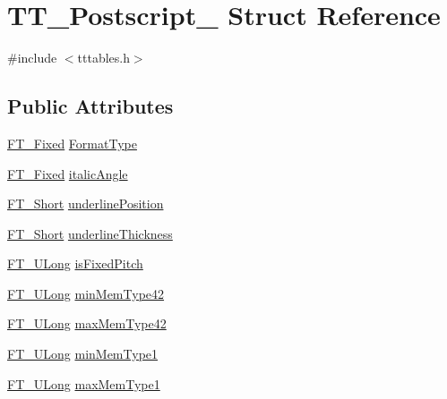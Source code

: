 \hypertarget{struct_t_t___postscript__}{\section{T\-T\-\_\-\-Postscript\-\_\- Struct Reference}
\label{struct_t_t___postscript__}
}


{\ttfamily \#include $<$tttables.\-h$>$}

\subsection*{Public Attributes}
\begin{DoxyCompactItemize}
\item 
\hyperlink{fttypes_8h_a5f5a679cc09f758efdd0d1c5feed3c3d}{F\-T\-\_\-\-Fixed} \hyperlink{struct_t_t___postscript___a5ed6585c01fa4ffc3f8537d58bdd955f}{Format\-Type}
\item 
\hyperlink{fttypes_8h_a5f5a679cc09f758efdd0d1c5feed3c3d}{F\-T\-\_\-\-Fixed} \hyperlink{struct_t_t___postscript___adcca36c7fbcbdff00fc8c2884a215830}{italic\-Angle}
\item 
\hyperlink{fttypes_8h_aa7279be89046a2563cd3d4d6651fbdcf}{F\-T\-\_\-\-Short} \hyperlink{struct_t_t___postscript___a909fd5064ab7547bb8ed984b5dfe2fe2}{underline\-Position}
\item 
\hyperlink{fttypes_8h_aa7279be89046a2563cd3d4d6651fbdcf}{F\-T\-\_\-\-Short} \hyperlink{struct_t_t___postscript___a4e4654766a4f27054c9a35958515e186}{underline\-Thickness}
\item 
\hyperlink{fttypes_8h_a4fac88bdba78eb76b505efa6e4fbf3f5}{F\-T\-\_\-\-U\-Long} \hyperlink{struct_t_t___postscript___ab9a537994be4f81cb35f61f83cd97949}{is\-Fixed\-Pitch}
\item 
\hyperlink{fttypes_8h_a4fac88bdba78eb76b505efa6e4fbf3f5}{F\-T\-\_\-\-U\-Long} \hyperlink{struct_t_t___postscript___ad78af4931654c197d4a8d0f04d473885}{min\-Mem\-Type42}
\item 
\hyperlink{fttypes_8h_a4fac88bdba78eb76b505efa6e4fbf3f5}{F\-T\-\_\-\-U\-Long} \hyperlink{struct_t_t___postscript___a70c4ba372d04e686208f0fede9885314}{max\-Mem\-Type42}
\item 
\hyperlink{fttypes_8h_a4fac88bdba78eb76b505efa6e4fbf3f5}{F\-T\-\_\-\-U\-Long} \hyperlink{struct_t_t___postscript___a91a8b40f60e67a1920209e6b08355848}{min\-Mem\-Type1}
\item 
\hyperlink{fttypes_8h_a4fac88bdba78eb76b505efa6e4fbf3f5}{F\-T\-\_\-\-U\-Long} \hyperlink{struct_t_t___postscript___a944a3df5127262db0f7ae92868defb99}{max\-Mem\-Type1}
\end{DoxyCompactItemize}


